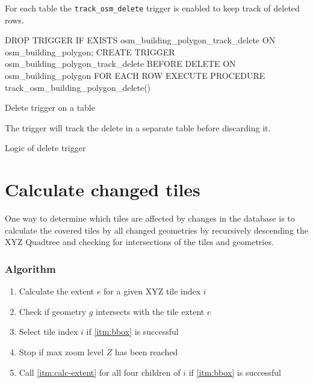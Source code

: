 For each table the \texttt{track\_osm\_delete} trigger is enabled to keep track of deleted rows.

\begin{listing}[H]
  \centering
  \begin{sqlcode}
    DROP TRIGGER IF EXISTS osm_building_polygon_track_delete ON osm_building_polygon;
    CREATE TRIGGER osm_building_polygon_track_delete
    BEFORE DELETE ON osm_building_polygon
    FOR EACH ROW EXECUTE PROCEDURE track_osm_building_polygon_delete()
  \end{sqlcode}
  \caption{Delete trigger on a table}
\end{listing}

The trigger will track the delete in a separate table before discarding it.

\begin{listing}[H]
  \centering
  \caption{Logic of delete trigger}
\end{listing}


\newpage{}
\section{Calculate changed tiles}

One way to determine which tiles are affected by changes in the database is to calculate the covered tiles by all changed geometries by recursively descending the XYZ Quadtree and checking for intersections of the tiles and geometries.

\subsubsection*{Algorithm}

\begin{enumerate}  
    \item \label{itm:calc-extent}Calculate the extent $e$ for a given XYZ tile index $i$
    \item \label{itm:bbox} Check if geometry $g$ intersects with the tile extent $e$
    \item Select tile index $i$ if \ref{itm:bbox} is successful
    \item Stop if max zoom level $Z$ has been reached
    \item Call \ref{itm:calc-extent} for all four children of $i$ if \ref{itm:bbox} is successful
\end{enumerate}


